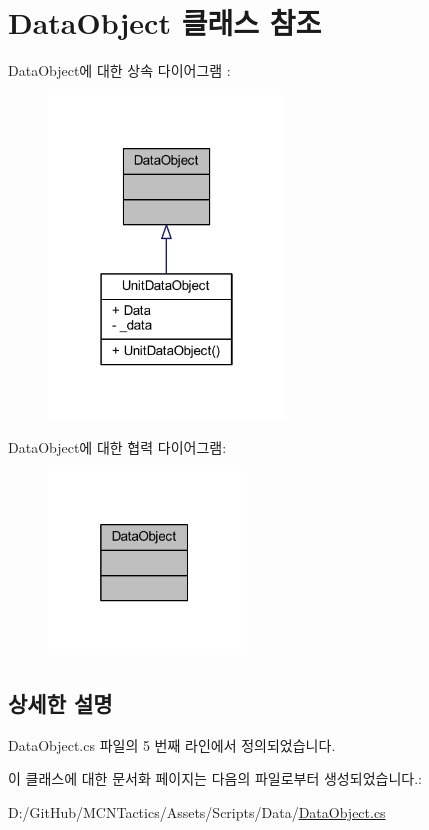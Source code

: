 \hypertarget{class_data_object}{}\section{Data\+Object 클래스 참조}
\label{class_data_object}


Data\+Object에 대한 상속 다이어그램 \+: 
\nopagebreak
\begin{figure}[H]
\begin{center}
\leavevmode
\includegraphics[width=178pt]{class_data_object__inherit__graph}
\end{center}
\end{figure}


Data\+Object에 대한 협력 다이어그램\+:
\nopagebreak
\begin{figure}[H]
\begin{center}
\leavevmode
\includegraphics[width=145pt]{class_data_object__coll__graph}
\end{center}
\end{figure}


\subsection{상세한 설명}


Data\+Object.\+cs 파일의 5 번째 라인에서 정의되었습니다.



이 클래스에 대한 문서화 페이지는 다음의 파일로부터 생성되었습니다.\+:\begin{DoxyCompactItemize}
\item 
D\+:/\+Git\+Hub/\+M\+C\+N\+Tactics/\+Assets/\+Scripts/\+Data/\hyperlink{_data_object_8cs}{Data\+Object.\+cs}\end{DoxyCompactItemize}
